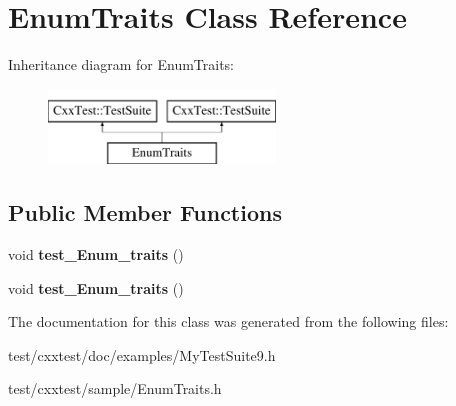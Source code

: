 \hypertarget{classEnumTraits}{\section{Enum\-Traits Class Reference}
\label{classEnumTraits}
}
Inheritance diagram for Enum\-Traits\-:\begin{figure}[H]
\begin{center}
\leavevmode
\includegraphics[height=2.000000cm]{classEnumTraits}
\end{center}
\end{figure}
\subsection*{Public Member Functions}
\begin{DoxyCompactItemize}
\item 
\hypertarget{classEnumTraits_a047802487e9741e9a8b4a7cf5e93e3b6}{void {\bfseries test\-\_\-\-Enum\-\_\-traits} ()}\label{classEnumTraits_a047802487e9741e9a8b4a7cf5e93e3b6}

\item 
\hypertarget{classEnumTraits_a047802487e9741e9a8b4a7cf5e93e3b6}{void {\bfseries test\-\_\-\-Enum\-\_\-traits} ()}\label{classEnumTraits_a047802487e9741e9a8b4a7cf5e93e3b6}

\end{DoxyCompactItemize}


The documentation for this class was generated from the following files\-:\begin{DoxyCompactItemize}
\item 
test/cxxtest/doc/examples/My\-Test\-Suite9.\-h\item 
test/cxxtest/sample/Enum\-Traits.\-h\end{DoxyCompactItemize}
